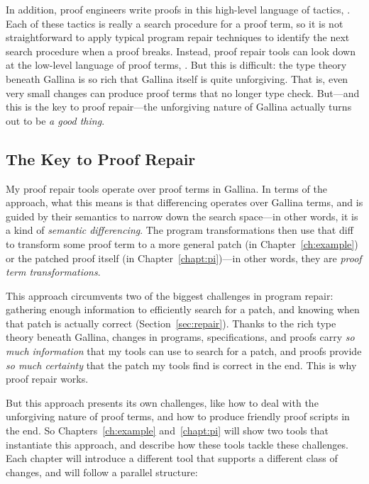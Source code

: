 In addition, proof engineers write proofs in this high-level language of tactics, .
Each of these tactics is really a search procedure for a proof term, so it is not straightforward to apply
typical program repair techniques to identify the next search procedure when a proof breaks.
Instead, proof repair tools can look down at the low-level language of proof terms, .
But this is difficult: the type theory beneath Gallina is so rich that Gallina itself is quite unforgiving.
That is, even very small changes can produce proof terms that no longer type check.
But---and this is the key to proof repair---the unforgiving nature of Gallina actually turns out to be \textit{a good thing}.

\subsection{The Key to Proof Repair}
\label{sec:infocert}

My proof repair tools operate over proof terms in Gallina.
In terms of the approach, what this means is that differencing operates over Gallina terms,
and is guided by their semantics to narrow down the search space---in other words,
it is a kind of \textit{semantic differencing}.
The program transformations then use that diff to transform some proof term to a more general patch (in Chapter~\ref{ch:example})
or the patched proof itself (in Chapter~\ref{chapt:pi})---in other words,
they are \textit{proof term transformations}.

This approach circumvents two of the biggest challenges in program repair:
gathering enough information to efficiently search for a patch,
and knowing when that patch is actually correct (Section~\ref{sec:repair}).
Thanks to the rich type theory beneath Gallina, changes in programs, specifications, and proofs
carry \textit{so much information} that my tools can use to search for a patch,
and proofs provide \textit{so much certainty} that the patch my tools find is correct in the end.
This is why proof repair works.

But this approach presents its own challenges,
like how to deal with the unforgiving nature of proof terms,
and how to produce friendly proof scripts in the end.
So Chapters~\ref{ch:example} and~\ref{chapt:pi} will show two tools that instantiate this approach,
and describe how these tools tackle these challenges.
Each chapter will introduce a different tool that supports a different class of changes,
and will follow a parallel structure:

